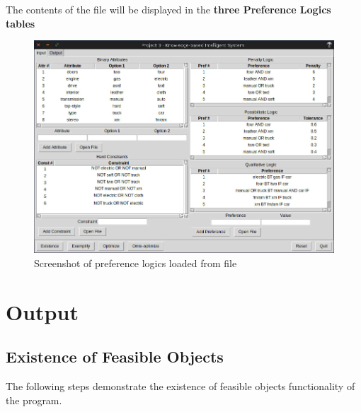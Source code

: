 \documentclass[12pt]{report}
\begin{document}
\begin{description}[leftmargin=4em]
\begin{figure}[H]
\begin{center}
\end{center}
\end{figure}
\vspace{-2.5em}
\item [Result:] The contents of the file will be displayed in the \textbf{three Preference Logics tables}
\begin{figure}[H]
\begin{center}
\includegraphics[scale=0.3,trim=1cm 1cm 1cm 1cm]{preferences_imported}
\caption{Screenshot of preference logics loaded from file}
\end{center}
\end{figure}
\vspace{-2.5em}
\end{description}


\chapter{Output}
\section{Existence of Feasible Objects}
The following steps demonstrate the existence of feasible objects functionality of the program.\\
\end{document}
